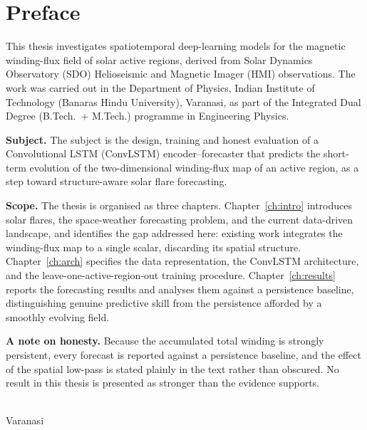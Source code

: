 \chapter*{Preface}

\vspace{0.8cm}

This thesis investigates spatiotemporal deep-learning models for the magnetic
winding-flux field of solar active regions, derived from Solar Dynamics
Observatory (SDO) Helioseismic and Magnetic Imager (HMI) observations. The work
was carried out in the Department of Physics, Indian Institute of Technology
(Banaras Hindu University), Varanasi, as part of the Integrated Dual Degree
(B.Tech.\ + M.Tech.) programme in Engineering Physics.

\noindent\textbf{Subject.}\quad
The subject is the design, training and honest evaluation of a Convolutional
LSTM (ConvLSTM) encoder--forecaster that predicts the short-term evolution of
the two-dimensional winding-flux map of an active region, as a step toward
structure-aware solar flare forecasting.

\noindent\textbf{Scope.}\quad
The thesis is organised as three chapters. Chapter~\ref{ch:intro} introduces
solar flares, the space-weather forecasting problem, and the current
data-driven landscape, and identifies the gap addressed here: existing work
integrates the winding-flux map to a single scalar, discarding its spatial
structure. Chapter~\ref{ch:arch} specifies the data representation, the ConvLSTM
architecture, and the leave-one-active-region-out training procedure.
Chapter~\ref{ch:results} reports the forecasting results and analyses them
against a persistence baseline, distinguishing genuine predictive skill from the
persistence afforded by a smoothly evolving field.

\noindent\textbf{A note on honesty.}\quad
Because the accumulated total winding is strongly persistent, every forecast is
reported against a persistence baseline, and the effect of the spatial low-pass
is stated plainly in the text rather than obscured. No result in this thesis is
presented as stronger than the evidence supports.

\vspace{2cm}

\noindent
\hfill \theauthorname\\
\hfill Varanasi
